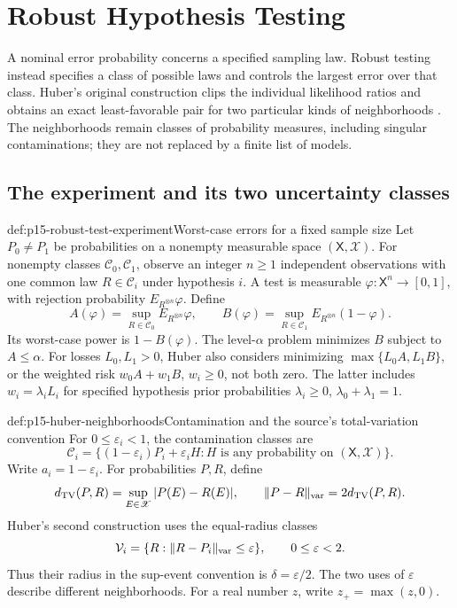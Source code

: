 \chapter{Robust Hypothesis Testing}
\label{sec:p15-robust-hypothesis-testing}

A nominal error probability concerns a specified sampling law.
Robust testing instead specifies a class of possible laws and controls
the largest error over that class. Huber's original construction clips
the individual likelihood ratios and obtains an exact least-favorable
pair for two particular kinds of neighborhoods
\cite[Secs.~2--4 and 7]{Huber1965RobustProbabilityRatio}.
The neighborhoods remain classes of probability measures, including
singular contaminations; they are not replaced by a finite list of models.

\section{The experiment and its two uncertainty classes}
\label{sec:p15-robust-neighborhoods}

\begin{hbdefinition}{def:p15-robust-test-experiment}{Worst-case errors for a fixed sample size}
Let \(P_0\ne P_1\) be probabilities on a nonempty measurable space
\((\mathsf X,\mathscr X)\). For nonempty classes \(\mathcal C_0,\mathcal C_1\),
observe an integer \(n\geq1\) independent observations with one common law
\(R\in\mathcal C_i\) under hypothesis \(i\).
A test is measurable \(\varphi:\mathsf X^n\to[0,1]\), with rejection
probability \(E_{R^{\otimes n}}\varphi\).
Define
\[
 A(\varphi)=\sup_{R\in\mathcal C_0}E_{R^{\otimes n}}\varphi,\qquad
 B(\varphi)=\sup_{R\in\mathcal C_1}E_{R^{\otimes n}}(1-\varphi).
\]
Its worst-case power is \(1-B(\varphi)\). The level-\(\alpha\) problem
minimizes \(B\) subject to \(A\leq\alpha\).
For losses \(L_0,L_1>0\), Huber also considers minimizing
\(\max\{L_0A,L_1B\}\), or the weighted risk
\(w_0A+w_1B\), \(w_i\geq0\), not both zero.
The latter includes \(w_i=\lambda_iL_i\) for specified hypothesis
prior probabilities \(\lambda_i\geq0\), \(\lambda_0+\lambda_1=1\).
\end{hbdefinition}

\begin{hbdefinition}{def:p15-huber-neighborhoods}{Contamination and the source's total-variation convention}
For \(0\leq\varepsilon_i<1\), the contamination classes are
\[
 \mathcal C_i=
 \{(1-\varepsilon_i)P_i+\varepsilon_i H:H
          \text{ is any probability on }(\mathsf X,\mathscr X)\}.
\]
Write \(a_i=1-\varepsilon_i\).
For probabilities \(P,R\), define
\[
 d_{\rm TV}(P,R)=\sup_{E\in\mathscr X}|P(E)-R(E)|,\qquad
 \|P-R\|_{\rm var}=2d_{\rm TV}(P,R).
\]
Huber's second construction uses the equal-radius classes
\[
 \mathcal V_i=\{R:\|R-P_i\|_{\rm var}\leq\varepsilon\},
                 \qquad 0\leq\varepsilon<2.
\]
Thus their radius in the sup-event convention is \(\delta=\varepsilon/2\).
The two uses of \(\varepsilon\) describe different neighborhoods.
For a real number \(z\), write \(z_+=\max(z,0)\).
\end{hbdefinition}

